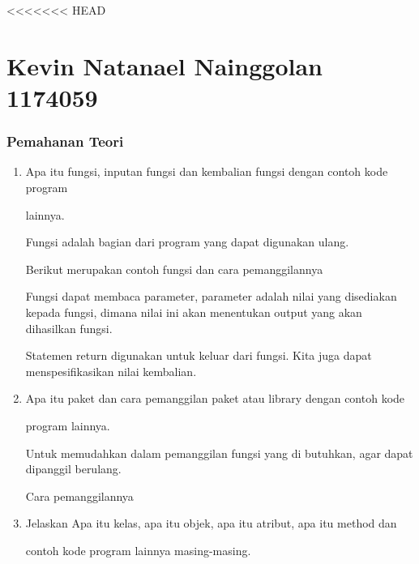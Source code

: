 <<<<<<< HEAD
\section {Kevin Natanael Nainggolan 1174059}
\subsubsection{Pemahanan Teori}

\begin{enumerate}

    \item Apa itu fungsi, inputan 
fungsi dan kembalian fungsi dengan contoh kode program

    lainnya.

    Fungsi adalah bagian dari program yang dapat digunakan ulang.

    Berikut merupakan contoh fungsi dan cara pemanggilannya

    



    Fungsi dapat membaca parameter, parameter adalah nilai yang disediakan kepada fungsi, dimana nilai ini akan menentukan output yang akan dihasilkan fungsi.

    



    Statemen return digunakan untuk keluar dari fungsi. Kita juga dapat menspesifikasikan nilai kembalian.

    



    \item Apa itu paket dan cara pemanggilan paket atau library dengan contoh kode

    program lainnya.

    Untuk memudahkan dalam pemanggilan fungsi yang di butuhkan, agar dapat dipanggil berulang.

    Cara pemanggilannya

    



    \item Jelaskan Apa itu kelas, apa itu objek, apa itu atribut, apa itu method dan

    contoh kode program lainnya masing-masing.


\end{enumerate}
